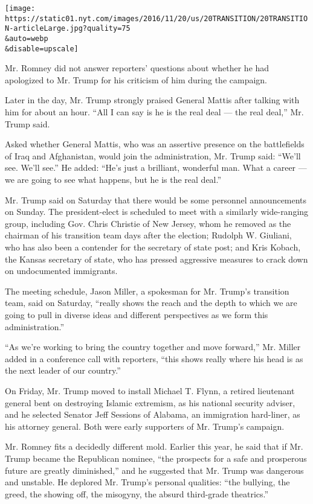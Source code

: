 \texttt{[image: https://static01.nyt.com/images/2016/11/20/us/20TRANSITION/20TRANSITION-articleLarge.jpg?quality=75\\\&auto=webp\\\&disable=upscale]}

Mr. Romney did not answer reporters' questions about whether he had
apologized to Mr. Trump for his criticism of him during the campaign.

Later in the day, Mr. Trump strongly praised General Mattis after
talking with him for about an hour. ``All I can say is he is the real
deal --- the real deal,'' Mr. Trump said.

Asked whether General Mattis, who was an assertive presence on the
battlefields of Iraq and Afghanistan, would join the administration, Mr.
Trump said: ``We'll see. We'll see.'' He added: ``He's just a brilliant,
wonderful man. What a career --- we are going to see what happens, but
he is the real deal.''

Mr. Trump said on Saturday that there would be some personnel
announcements on Sunday. The president-elect is scheduled to meet with a
similarly wide-ranging group, including Gov. Chris Christie of New
Jersey, whom he removed as the chairman of his transition team days
after the election; Rudolph W. Giuliani, who has also been a contender
for the secretary of state post; and Kris Kobach, the Kansas secretary
of state, who has pressed aggressive measures to crack down on
undocumented immigrants.

The meeting schedule, Jason Miller, a spokesman for Mr. Trump's
transition team, said on Saturday, ``really shows the reach and the
depth to which we are going to pull in diverse ideas and different
perspectives as we form this administration.''

``As we're working to bring the country together and move forward,'' Mr.
Miller added in a conference call with reporters, ``this shows really
where his head is as the next leader of our country.''

On Friday, Mr. Trump moved to install Michael T. Flynn, a retired
lieutenant general bent on destroying Islamic extremism, as his national
security adviser, and he selected Senator Jeff Sessions of Alabama, an
immigration hard-liner, as his attorney general. Both were early
supporters of Mr. Trump's campaign.

Mr. Romney fits a decidedly different mold. Earlier this year, he said
that if Mr. Trump became the Republican nominee, ``the prospects for a
safe and prosperous future are greatly diminished,'' and he suggested
that Mr. Trump was dangerous and unstable. He deplored Mr. Trump's
personal qualities: ``the bullying, the greed, the showing off, the
misogyny, the absurd third-grade theatrics.''

